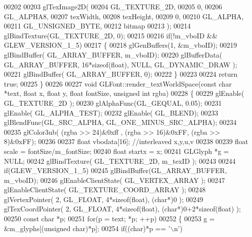 \begin{DoxyCode}
00202 
00203     glTexImage2D(
00204         GL_TEXTURE_2D,
00205         0,
00206         GL_ALPHA8,
00207         texWidth,
00208         texHeight,
00209         0,
00210         GL_ALPHA,
00211         GL_UNSIGNED_BYTE,
00212         bitmap
00213     );
00214     glBindTexture(GL_TEXTURE_2D, 0);
00215 
00216     \textcolor{keywordflow}{if}(!m_vboID && GLEW_VERSION_1_5)
00217     \{
00218         glGenBuffers(1, &m_vboID);
00219         glBindBuffer( GL_ARRAY_BUFFER, m_vboID);
00220         glBufferData( GL_ARRAY_BUFFER, 16*\textcolor{keyword}{sizeof}(\textcolor{keywordtype}{float}), NULL, GL_DYNAMIC_DRAW );
00221         glBindBuffer( GL_ARRAY_BUFFER, 0);
00222     \}
00223 
00224     \textcolor{keywordflow}{return} \textcolor{keyword}{true};
00225 \}
00226 
00227 \textcolor{keywordtype}{void} GLFont::render_textWorldSpace(\textcolor{keyword}{const} \textcolor{keywordtype}{char} *text, \textcolor{keywordtype}{float} x, \textcolor{keywordtype}{float} y, \textcolor{keywordtype}{float} fontSize, \textcolor{keywordtype}{unsigned} \textcolor{keywordtype}{int} rgba)
00228 \{
00229     glEnable( GL_TEXTURE_2D );
00230     glAlphaFunc(GL_GEQUAL, 0.05);
00231     glEnable( GL_ALPHA_TEST);
00232     glEnable( GL_BLEND);
00233     glBlendFunc(GL_SRC_ALPHA, GL_ONE_MINUS_SRC_ALPHA);
00234 
00235     glColor3ub( (rgba >> 24)&0xff , (rgba >> 16)&0xFF, (rgba >> 8)&0xFF);
00236 
00237     \textcolor{keywordtype}{float} vbodata[16]; \textcolor{comment}{//interleaved x,y,u,v}
00238 
00239     \textcolor{keywordtype}{float} scale = fontSize/m_fontSize;
00240     \textcolor{keywordtype}{float} startx = x;
00241     GLGlyph *g = NULL;
00242     glBindTexture( GL_TEXTURE_2D, m_texID );
00243 
00244     \textcolor{keywordflow}{if}(GLEW_VERSION_1_5)
00245         glBindBuffer(GL_ARRAY_BUFFER, m_vboID);
00246     glEnableClientState( GL_VERTEX_ARRAY );
00247     glEnableClientState( GL_TEXTURE_COORD_ARRAY );
00248     glVertexPointer( 2, GL_FLOAT, 4*\textcolor{keyword}{sizeof}(\textcolor{keywordtype}{float}), (\textcolor{keywordtype}{char}*)0 );
00249     glTexCoordPointer( 2, GL_FLOAT, 4*\textcolor{keyword}{sizeof}(\textcolor{keywordtype}{float}), (\textcolor{keywordtype}{char}*)0+2*\textcolor{keyword}{sizeof}(\textcolor{keywordtype}{float}) );
00250     \textcolor{keyword}{const} \textcolor{keywordtype}{char} *p;
00251     \textcolor{keywordflow}{for}(p = text; *p; ++p)
00252     \{
00253         g = &m_glyphs[(\textcolor{keywordtype}{unsigned} char)*p];
00254         \textcolor{keywordflow}{if}((\textcolor{keywordtype}{char})*p == \textcolor{charliteral}{'\(\backslash\)n'})

\end{DoxyCode}

